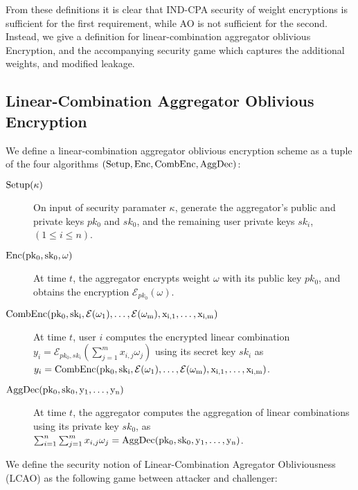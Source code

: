 \documentclass[twocolumn]{autart}
\theoremstyle{definition}
\begin{document}
From these definitions it is clear that IND-CPA security of weight encryptions is sufficient for the first requirement, while AO is not sufficient for the second. Instead, we give a definition for linear-combination aggregator oblivious Encryption, and the accompanying security game which captures the additional weights, and modified leakage.

\subsection{Linear-Combination Aggregator Oblivious Encryption}
We define a linear-combination aggregator oblivious encryption scheme as a tuple of the four algorithms $(\operatorfont{Setup}, \operatorfont{Enc}, \operatorfont{CombEnc}, \operatorfont{AggDec})$:
\begin{description}
    \item[$\operatorfont{Setup}(\kappa)$] On input of security paramater $\kappa$, generate the aggregator's public and private keys $pk_0$ and $sk_0$, and the remaining user private keys $sk_i$, $(1\leq i \leq n)$.
    \item[$\operatorfont{Enc}(pk_0, sk_0, \omega)$] At time $t$, the aggregator encrypts weight $\omega$ with its public key $pk_0$, and obtains the encryption $\mathcal{E}_{pk_0}(\omega)$.
    \item[$\operatorfont{CombEnc}(pk_0, sk_i, \mathcal{E}(\omega_1),\dots,\mathcal{E}(\omega_m), x_{i,1},\dots,x_{i,m})$] At time $t$, user $i$ computes the encrypted linear combination $y_i = \mathcal{E}_{pk_0,sk_i}(\sum^m_{j=1}x_{i,j}\omega_j)$ using its secret key $sk_i$ as $y_i = \operatorfont{CombEnc}(pk_0, sk_i, \mathcal{E}(\omega_1),\dots,\mathcal{E}(\omega_m), x_{i,1},\dots,x_{i,m})$.
    \item[$\operatorfont{AggDec}(pk_0, sk_0, y_1,\dots,y_n)$] At time $t$, the aggregator computes the aggregation of linear combinations using its private key $sk_0$, as $\sum^{n}_{i=1}\sum^{m}_{j=1} x_{i,j}\omega_j = \operatorfont{AggDec}(pk_0, sk_0, y_1,\dots,y_n)$.
\end{description}

We define the security notion of Linear-Combination Agregator Obliviousness (LCAO) as the following game between attacker and challenger:
\end{document}
